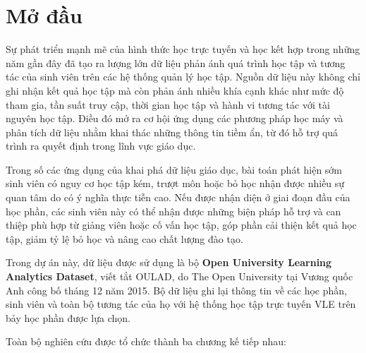 \documentclass[a4paper]{report}
\begin{document}
\tableofcontents
\listoffigures
\listoftables
\clearpage


\chapter*{Mở đầu}

Sự phát triển mạnh mẽ của hình thức học trực tuyến và học kết hợp trong những năm gần đây
đã tạo ra lượng lớn dữ liệu phản ánh quá trình học tập và tương tác của sinh viên trên các hệ thống
quản lý học tập. Nguồn dữ liệu này không chỉ ghi nhận kết quả học tập mà còn phản ánh nhiều khía cạnh khác
như mức độ tham gia, tần suất truy cập, thời gian học tập và hành vi tương tác với tài nguyên học tập.
Điều đó mở ra cơ hội ứng dụng các phương pháp học máy và phân tích dữ liệu nhằm khai thác những thông tin
tiềm ẩn, từ đó hỗ trợ quá trình ra quyết định trong lĩnh vực giáo dục.

Trong số các ứng dụng của khai phá dữ liệu giáo dục, bài toán phát hiện sớm sinh viên có nguy cơ
học tập kém, trượt môn hoặc bỏ học nhận được nhiều sự quan tâm do có ý nghĩa thực tiễn cao.
Nếu được nhận diện ở giai đoạn đầu của học phần, các sinh viên này có thể nhận được những biện pháp hỗ trợ
và can thiệp phù hợp từ giảng viên hoặc cố vấn học tập, góp phần cải thiện kết quả học tập, giảm tỷ lệ bỏ học
và nâng cao chất lượng đào tạo.

Trong dự án này, dữ liệu được sử dụng là bộ \textbf{Open University Learning
Analytics Dataset}, viết tắt OULAD, do The Open University tại Vương quốc Anh
công bố tháng 12 năm 2015. Bộ dữ liệu ghi lại thông tin về các học phần, sinh
viên và toàn bộ tương tác của họ với hệ thống học tập trực tuyến VLE trên bảy
học phần được lựa chọn.

Toàn bộ nghiên cứu được tổ chức thành ba chương kế tiếp nhau:
\end{document}
